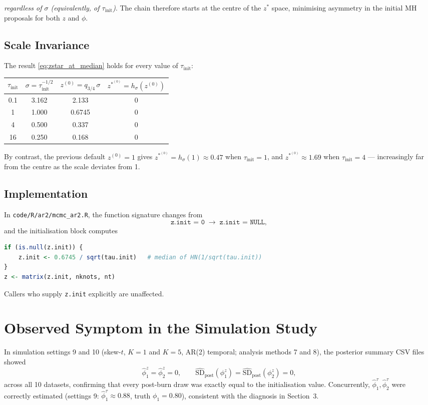 \documentclass[11pt]{article}
\newcommand{\zstar}{z^*}
\newcommand{\zinit}{z^{(0)}}
\begin{document}
\emph{regardless of $\sigma$ (equivalently, of $\tau_{\mathrm{init}}$)}.
The chain therefore starts at the centre of the $\zstar$ space,
minimising asymmetry in the initial MH proposals for both $z$ and $\phi$.

\subsection{Scale Invariance}

The result \eqref{eq:zstar_at_median} holds for every value of
$\tau_{\mathrm{init}}$:

\begin{center}
\begin{tabular}{cccc}
\hline
$\tau_{\mathrm{init}}$ & $\sigma = \tau_{\mathrm{init}}^{-1/2}$ &
$\zinit = q_{3/4}\,\sigma$ & $\zstar^{(0)} = h_\sigma(\zinit)$ \\
\hline
0.1  & 3.162 & 2.133 & 0 \\
1    & 1.000 & 0.6745 & 0 \\
4    & 0.500 & 0.337  & 0 \\
16   & 0.250 & 0.168  & 0 \\
\hline
\end{tabular}
\end{center}

By contrast, the previous default $\zinit = 1$ gives
$\zstar^{(0)} = h_\sigma(1) \approx 0.47$ when $\tau_{\mathrm{init}} = 1$,
and $\zstar^{(0)} \approx 1.69$ when $\tau_{\mathrm{init}} = 4$ —
increasingly far from the centre as the scale deviates from 1.

\subsection{Implementation}

In \texttt{code/R/ar2/mcmc\_ar2.R}, the function signature changes from
\[
  \texttt{z.init = 0} \;\longrightarrow\; \texttt{z.init = NULL},
\]
and the initialisation block computes
\begin{lstlisting}[language=R, basicstyle=\ttfamily\small]
if (is.null(z.init)) {
    z.init <- 0.6745 / sqrt(tau.init)   # median of HN(1/sqrt(tau.init))
}
z <- matrix(z.init, nknots, nt)
\end{lstlisting}
Callers who supply \texttt{z.init} explicitly are unaffected.

\section{Observed Symptom in the Simulation Study}

In simulation settings 9 and 10 (skew-$t$, $K=1$ and $K=5$,
AR(2) temporal; analysis methods 7 and 8), the posterior summary CSV files
showed
\[
  \hat{\phi}_1^z = \hat{\phi}_2^z = 0,
  \qquad
  \widehat{\mathrm{SD}}_{\mathrm{post}}(\phi_1^z)
  = \widehat{\mathrm{SD}}_{\mathrm{post}}(\phi_2^z) = 0,
\]
across all 10 datasets, confirming that every post-burn draw was exactly
equal to the initialisation value.  Concurrently,
$\hat{\phi}_1^\tau, \hat{\phi}_2^\tau$ were correctly estimated
(settings 9: $\hat\phi_1^\tau \approx 0.88$, truth $\phi_1 = 0.80$),
consistent with the diagnosis in Section~3.
\end{document}
